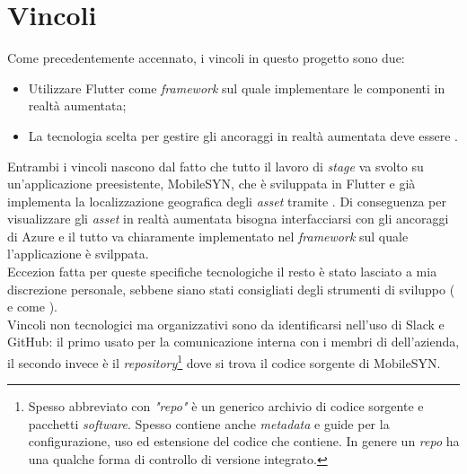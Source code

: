 \section{Vincoli}
Come precedentemente accennato, i vincoli in questo progetto sono due: 
\begin{itemize}
    \item Utilizzare Flutter come \textit{framework} sul quale implementare le componenti in realtà aumentata;
    \item La tecnologia scelta per gestire gli ancoraggi in realtà aumentata deve essere \asa{}.
\end{itemize}
Entrambi i vincoli nascono dal fatto che tutto il lavoro di \textit{stage} va svolto su un'applicazione preesistente, MobileSYN, che è sviluppata in Flutter e già implementa la localizzazione geografica degli \textit{asset} tramite \asa{}. Di conseguenza per visualizzare gli \textit{asset} in realtà aumentata bisogna interfacciarsi con gli ancoraggi di Azure e il tutto va chiaramente implementato nel \textit{framework} sul quale l'applicazione è svilppata.\\
Eccezion fatta per queste specifiche tecnologiche il resto è stato lasciato a mia discrezione personale, sebbene siano stati consigliati degli strumenti di sviluppo (\vsc{} e \astudio{} come \ide{}). \\
Vincoli non tecnologici ma organizzativi sono da identificarsi nell'uso di Slack e GitHub: il primo usato per la comunicazione interna con i membri di dell'azienda, il secondo invece è il \textit{repository}\footnote{Spesso abbreviato con \textit{"repo"} è un generico archivio di codice sorgente e pacchetti \textit{software}. Spesso contiene anche \textit{metadata} e guide per la configurazione, uso ed estensione del codice che contiene. In genere un \textit{repo} ha una qualche forma di controllo di versione integrato.} dove si trova il codice sorgente di MobileSYN.

